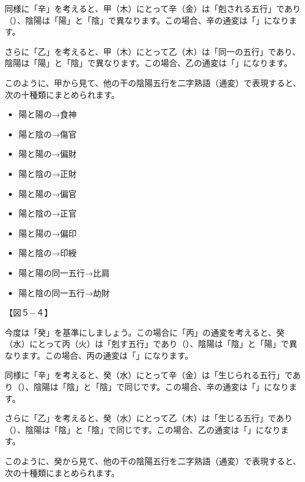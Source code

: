 \documentclass[a5paper,11pt,dvipdfmx]{tarticle}
\begin{document}
同様に「辛」を考えると、甲（木）にとって辛（金）は「剋される五行」であり（）、陰陽は「陽」と「陰」で異なります。この場合、辛の通変は「」になります。

さらに「乙」を考えると、甲（木）にとって乙（木）は「同一の五行」であり、陰陽は「陽」と「陰」で異なります。この場合、乙の通変は「」になります。

このように、甲から見て、他の干の陰陽五行を二字熟語（通変）で表現すると、次の十種類にまとめられます。

\begin{itemize}
  \item 陽と陽の→食神
  \item 陽と陰の→傷官
  \item 陽と陽の→偏財
  \item 陽と陰の→正財
  \item 陽と陽の→偏官
  \item 陽と陰の→正官
  \item 陽と陽の→偏印
  \item 陽と陰の→印綬
  \item 陽と陽の同一五行→比肩
  \item 陽と陰の同一五行→劫財
\end{itemize}

【図５−４】

今度は「癸」を基準にしましょう。この場合に「丙」の通変を考えると、癸（水）にとって丙（火）は「剋す五行」であり（）、陰陽は「陰」と「陽」で異なります。この場合、丙の通変は「」になります。

同様に「辛」を考えると、癸（水）にとって辛（金）は「生じられる五行」であり（）、陰陽は「陰」と「陰」で同じです。この場合、辛の通変は「」になります。

さらに「乙」を考えると、癸（水）にとって乙（木）は「生じる五行」であり（）、陰陽は「陰」と「陰」で同じです。この場合、乙の通変は「」になります。

このように、癸から見て、他の干の陰陽五行を二字熟語（通変）で表現すると、次の十種類にまとめられます。
\end{document}
